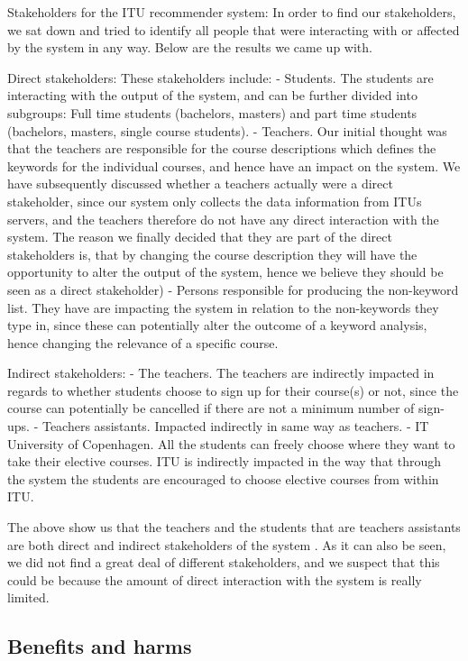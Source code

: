 Stakeholders for the ITU recommender system:
In order to find our stakeholders, we sat down and tried to identify all people that were interacting with or affected by the system in any way. Below are the results we came up with.

Direct stakeholders:  These stakeholders include:
- Students. The students are interacting with the output of the system, and can be further divided into subgroups: Full time students (bachelors, masters) and part time students (bachelors, masters, single course students).
- Teachers. Our initial thought was that the teachers are responsible for the course descriptions which defines the keywords for the individual courses, and hence have an impact on the system. We have subsequently discussed whether a teachers actually were a direct stakeholder, since our system only collects the data information from ITUs servers, and the teachers therefore do not have any direct interaction with the system. The reason we finally decided that they are part of the direct stakeholders is, that by changing the course description they will have the opportunity to alter the output of the system, hence we believe they should be seen as a direct stakeholder)
- Persons responsible for producing the non-keyword list. They have are impacting the system in relation to the non-keywords they type in, since these can potentially alter the outcome of a keyword analysis, hence changing the relevance of a specific course.

Indirect stakeholders: 
- The teachers. The teachers are indirectly impacted in regards to whether students choose to sign up for their course(s) or not, since the course can potentially be cancelled if there are not a minimum number of sign-ups.
- Teachers assistants. Impacted indirectly in same way as teachers.
- IT University of Copenhagen. All the students can freely choose where they want to take their elective courses. ITU is indirectly impacted in the way that  through the system the students are encouraged to choose elective courses from within ITU. 


The above show us that the teachers and the students that are teachers assistants are both direct and indirect stakeholders of the system . As it can also be seen, we did not find a great deal of different stakeholders, and we suspect that this could be because the amount of direct interaction with the system is really limited. 


\subsection{Benefits and harms}

